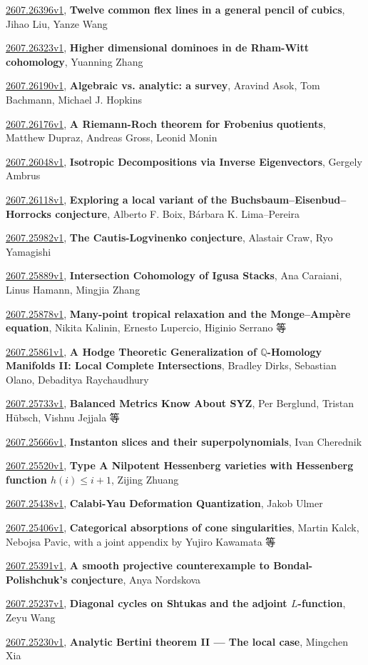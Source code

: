 \documentclass[9pt, a4paper]{article}
\theoremstyle{plain}
\theoremstyle{definition}
\theoremstyle{remark}
\newcommand{\arxiv}[3]{\href{https://arxiv.org/abs/#1}{#1}, \textbf{\textcolor{arxivblue}{#2}}, #3}
\begin{document}
\arxiv{2607.26396v1}{Twelve common flex lines in a general pencil of cubics}{Jihao Liu, Yanze Wang}

\arxiv{2607.26323v1}{Higher dimensional dominoes in de Rham-Witt cohomology}{Yuanning Zhang}

\arxiv{2607.26190v1}{Algebraic vs. analytic: a survey}{Aravind Asok, Tom Bachmann, Michael J. Hopkins}

\arxiv{2607.26176v1}{A Riemann-Roch theorem for Frobenius quotients}{Matthew Dupraz, Andreas Gross, Leonid Monin}

\arxiv{2607.26048v1}{Isotropic Decompositions via Inverse Eigenvectors}{Gergely Ambrus}

\arxiv{2607.26118v1}{Exploring a local variant of the Buchsbaum--Eisenbud--Horrocks conjecture}{Alberto F. Boix, Bárbara K. Lima--Pereira}

\arxiv{2607.25982v1}{The Cautis-Logvinenko conjecture}{Alastair Craw, Ryo Yamagishi}

\arxiv{2607.25889v1}{Intersection Cohomology of Igusa Stacks}{Ana Caraiani, Linus Hamann, Mingjia Zhang}

\arxiv{2607.25878v1}{Many-point tropical relaxation and the Monge--Ampère equation}{Nikita Kalinin, Ernesto Lupercio, Higinio Serrano 等}

\arxiv{2607.25861v1}{A Hodge Theoretic Generalization of $\mathbb{Q}$-Homology Manifolds II: Local Complete Intersections}{Bradley Dirks, Sebastian Olano, Debaditya Raychaudhury}

\arxiv{2607.25733v1}{Balanced Metrics Know About SYZ}{Per Berglund, Tristan Hübsch, Vishnu Jejjala 等}

\arxiv{2607.25666v1}{Instanton slices and their superpolynomials}{Ivan Cherednik}

\arxiv{2607.25520v1}{Type A Nilpotent Hessenberg varieties with Hessenberg function $h(i)\le i+1$}{Zijing Zhuang}

\arxiv{2607.25438v1}{Calabi-Yau Deformation Quantization}{Jakob Ulmer}

\arxiv{2607.25406v1}{Categorical absorptions of cone singularities}{Martin Kalck, Nebojsa Pavic, with a joint appendix by Yujiro Kawamata 等}

\arxiv{2607.25391v1}{A smooth projective counterexample to Bondal-Polishchuk's conjecture}{Anya Nordskova}

\arxiv{2607.25237v1}{Diagonal cycles on Shtukas and the adjoint $L$-function}{Zeyu Wang}

\arxiv{2607.25230v1}{Analytic Bertini theorem II --- The local case}{Mingchen Xia}
\end{document}
